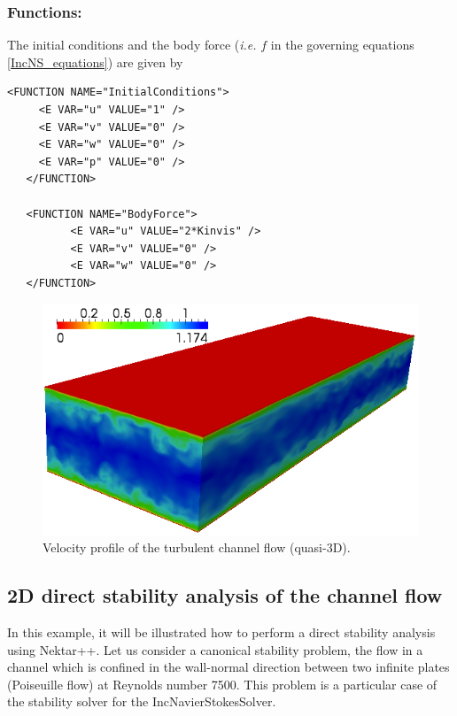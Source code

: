 \subsubsection{Functions:~} The initial conditions and the body force (\textit{i.e.} $f$ in the governing equations \ref{IncNS_equations}) are given by
\begin{lstlisting}[style=XMLStyle]
   <FUNCTION NAME="InitialConditions">
     <E VAR="u" VALUE="1" />
     <E VAR="v" VALUE="0" />
     <E VAR="w" VALUE="0" />
     <E VAR="p" VALUE="0" />
   </FUNCTION>
   
   <FUNCTION NAME="BodyForce">
          <E VAR="u" VALUE="2*Kinvis" />
          <E VAR="v" VALUE="0" />
          <E VAR="w" VALUE="0" />
   </FUNCTION>
\end{lstlisting}


\begin{figure}
\begin{center}
\includegraphics[width=12cm]{Figures/ChanCont.png}
\caption{Velocity profile of the turbulent channel flow (quasi-3D).}
\end{center}
\end{figure}



 
 \subsection{2D direct stability analysis of the channel flow}
 
  In this example, it will be illustrated how to perform a direct stability analysis using Nektar++. Let us consider a canonical stability problem, the flow in a channel which is confined in the wall-normal direction between two infinite plates (Poiseuille flow) at Reynolds number 7500. This problem is a particular case of the stability solver for the IncNavierStokesSolver. 
  
